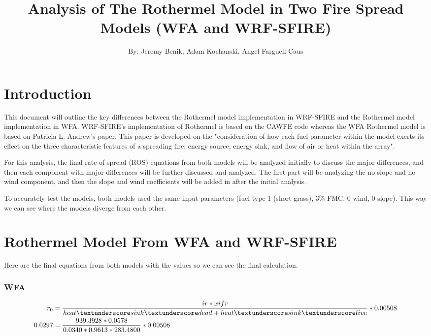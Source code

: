 \documentclass{article}
\newcommand\und{\textunderscore}
\begin{document}
\title{Analysis of The Rothermel Model in Two Fire Spread Models (WFA and WRF-SFIRE)}
\author{By: Jeremy Benik, Adam Kochanski, Angel Farguell Caus}
\maketitle


\section{Introduction}
	This document will outline the key differences between the Rothermel model implementation in WRF-SFIRE and the Rothermel model implementation in WFA. WRF-SFIRE's implementation of Rothermel is based on the CAWFE code whereas the WFA Rothermel model is based on Patricia L. Andrew's paper. This paper is developed on the "consideration of how each fuel parameter within the model exerts its effect on the three characteristic features of a spreading fire: energy source, energy sink, and flow of air or heat within the array"\citep{Andrews2018}. 
	
	For this analysis, the final rate of spread (ROS) equations from both models will be analyzed initially to discuss the major differences, and then each component with major differences will be further discussed and analyzed. The first part will be analyzing the no slope and no wind component, and then the slope and wind coefficients will be added in after the initial analysis. 
	
	To accurately test the models, both models used the same input parameters (fuel type 1 (short grass), 3\% FMC, 0 wind, 0 slope). This way we can see where the models diverge from each other. 
	
\section{Rothermel Model From WFA and WRF-SFIRE}

Here are the final equations from both models with the values so we can see the final calculation. 

\subsubsection*{WFA}
	\begin{equation}
	\label{r0_WFA_2}
	\begin{split}
	r_0 &= \frac{ir * xifr}{heat\und sink\und dead + heat\und sink\und live} * 0.00508 \\
	0.0297 &= \frac{939.3928 * 0.0578}{0.0340 * 0.9613 * 283.4800} * 0.00508
	\end{split}
\end{equation}
\end{document}

